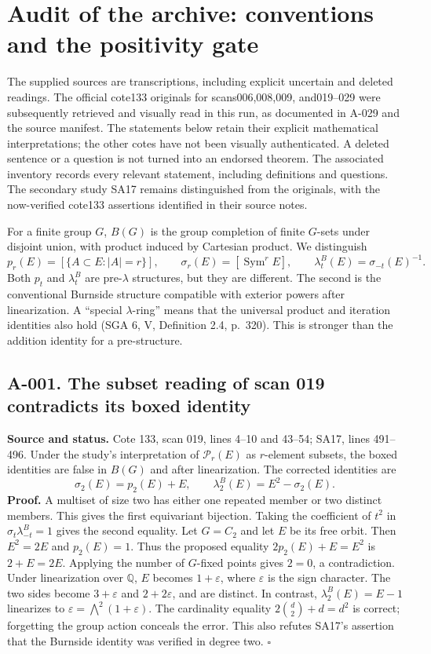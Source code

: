 \section{Audit of the archive: conventions and the positivity gate}
The supplied sources are transcriptions, including explicit uncertain and
deleted readings. The official cote133 originals for scans006,008,009,
and019--029 were subsequently retrieved and visually read in this run,
as documented in A-029 and the source manifest. The statements below
retain their explicit mathematical interpretations; the other cotes
have not been visually authenticated. A deleted sentence or a question
is not turned into an endorsed theorem. The associated inventory records
every relevant statement, including definitions and questions.
The secondary study SA17 remains distinguished from the originals,
with the now-verified cote133 assertions identified in their source notes.

For a finite group $G$, $B(G)$ is the group completion of finite $G$-sets under
disjoint union, with product induced by Cartesian product.  We distinguish
\[
 p_r(E)=[\{A\subset E:|A|=r\}],\qquad
 \sigma_r(E)=[\operatorname{Sym}^rE],\qquad
 \lambda_t^B(E)=\sigma_{-t}(E)^{-1}.
\]
Both $p_t$ and $\lambda_t^B$ are pre-$\lambda$ structures, but they are different.
The second is the conventional Burnside structure compatible with exterior
powers after linearization.  A ``special $\lambda$-ring'' means that the
universal product and iteration identities also hold (SGA 6, V, Definition
2.4, p.~320).  This is stronger than the addition identity for a pre-structure.

\subsection*{A-001. The subset reading of scan 019 contradicts its boxed identity}
\textbf{Source and status.} Cote 133, scan 019, lines 4--10 and 43--54;
SA17, lines 491--496.  Under the study's interpretation of $\mathcal P_r(E)$
as $r$-element subsets, the boxed identities are false in $B(G)$ and after
linearization.  The corrected identities are
\[
 \sigma_2(E)=p_2(E)+E,\qquad
 \lambda_2^B(E)=E^2-\sigma_2(E).
\]
\textbf{Proof.} A multiset of size two has either one repeated member or two
distinct members.  This gives the first equivariant bijection.  Taking the
coefficient of $t^2$ in $\sigma_t\lambda^B_{-t}=1$ gives the second equality.
Let $G=C_2$ and let $E$ be its free orbit.  Then $E^2=2E$ and $p_2(E)=1$.
Thus the proposed equality $2p_2(E)+E=E^2$ is $2+E=2E$.  Applying the number
of $G$-fixed points gives $2=0$, a contradiction.  Under linearization over
$\mathbb Q$, $E$ becomes $1+\varepsilon$, where $\varepsilon$ is the sign
character.  The two sides become $3+\varepsilon$ and $2+2\varepsilon$,
and are distinct.  In contrast, $\lambda_2^B(E)=E-1$ linearizes to
$\varepsilon=\bigwedge^2(1+\varepsilon)$.
The cardinality equality $2\binom d2+d=d^2$ is correct; forgetting the group
action conceals the error.  This also refutes SA17's assertion that the
Burnside identity was verified in degree two. \hfill$\square$

